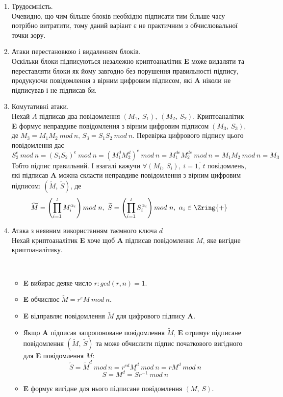 \begin{enumerate}
\item Трудоємність.\\
Очевидно, що чим більше блоків необхідно підписати тим більше часу потрібно витратити, тому даний варіант є не практичним з обчислювальної точки зору.
\item Атаки перестановкою і видаленням блоків. \\
Оскільки блоки підписуються незалежно криптоаналітик \textbf{E} може видаляти та переставляти блоки як йому завгодно без порушення правильності підпису, продукуючи повідомлення з вірним цифровим підписом, які \textbf{A} ніколи не підписував і не підписав би. 
\item Комутативні атаки. \\
Нехай \( A \) підписав два повідомлення \( \left( M_1,\ S_1 \right),\ \left( M_2,\ S_2 \right) \). Криптоаналітик \textbf{E} формує неправдиве повідомлення з вірним цифровим підписом \( \left(M_3,\ S_3 \right) \), де \( M_3 = M_1 M_2 \ mod\ n \), \( S_3 = S_1 S_2 \ mod\ n \). Перевірка цифрового підпису цього повідомлення дає \[ S_3^e \ mod\ n = (S_1 S_2)^e\ mod\ n = (M_1^d M_2^d)^e \ mod\ n = M_1^{de} M_2^{de} \ mod\ n = M_1 M_2\ mod\ n = M_3 \]
Тобто підпис правильний. І взагалі кажучи \( \forall (M_i,\ S_i),\ i = \overline{1,\ t} \) повідомлень, які підписав \textbf{A} можна скласти неправдиве повідомлення з вірним цифровим підписом: \( ( \widetilde{M},\ \widetilde{S} ) \), де \[ \widetilde{M} = \left( \prod_{i=1}^t M_i^{\alpha_i} \right) mod\ n,\ \widetilde{S} = \left( \prod_{i=1}^t S_i^{\alpha_i} \right) mod\ n, \ \alpha_i \in \Zring{+} \]
\item Атака з неявним використанням таємного ключа \( d \)\\
Нехай криптоаналітик \textbf{E} хоче щоб \textbf{A} підписав повідомлення \( M \), яке вигідне криптоаналітику. 
\begin{algorithm}\ 
\begin{itemize}
\item \textbf{E} вибирає деяке число \( r \colon gcd(r,n) = 1 \).
\item \textbf{E} обчислює \( \widetilde{M} = r^e M\ mod\ n \).
\item \textbf{E} відправляє повідомлення \( \widetilde{M} \) для цифрового підпису \textbf{A}.
\item Якщо \textbf{A} підписав запропоноване повідомлення \( \widetilde{M} \), \textbf{E} отримує підписане повідомлення \( (\widetilde{M},\ \widetilde{S}) \) та може обчислити підпис початкового вигідного для \textbf{E} повідомлення \( M \):
\[ \widetilde{S} = \widetilde{M}^d\ mod\ n = r^{ed} M^d\ mod\ n = r M^d\ mod\ n\]
\[ S = M^d = \widetilde{S} r^{-1}\ mod\ n \]
\item \textbf{E} формує вигідне для нього підписане повідомлення \( \left( M,\ S \right) \). 
\end{itemize}
\end{algorithm}
\end{enumerate}

